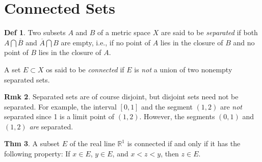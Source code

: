 \documentclass{article}
\theoremstyle{definition}
\newtheorem{definition}{Def}
\newtheorem{theorem}[definition]{Thm}
\newtheorem{remarks}[definition]{Rmk}
\begin{document}
\section{Connected Sets}
\begin{definition}
    Two subsets $A$ and $B$ of a metric space $X$ are said to be \textit{separated} if both $A\bigcap\overline{B}$ and $\overline{A}\bigcap B$ are empty, i.e., if no point of $A$ lies in the closure of $B$ and no point of $B$ lies in the closure of $A$.\par
    A set $E\subset X$ os said to be \textit{connected} if $E$ is \textit{not} a union of two nonempty separated sets.
\end{definition}
\begin{remarks}
    Separated sets are of course disjoint, but disjoint sets need not be separated. For example, the interval $[0,1]$ and the segment $(1, 2)$ are \textit{not} separated since 1 is a limit point of $(1, 2)$. However, the segments $(0,1)$ and $(1,2)$ \textit{are} separated.
\end{remarks}
\begin{theorem}
    A subset $E$ of the real line $\mathbb{R}^1$ is connected if and only if it has the following property: If $x\in E$, $y\in E$, and $x<z<y$, then $z\in E$.
\end{theorem}
\end{document}
